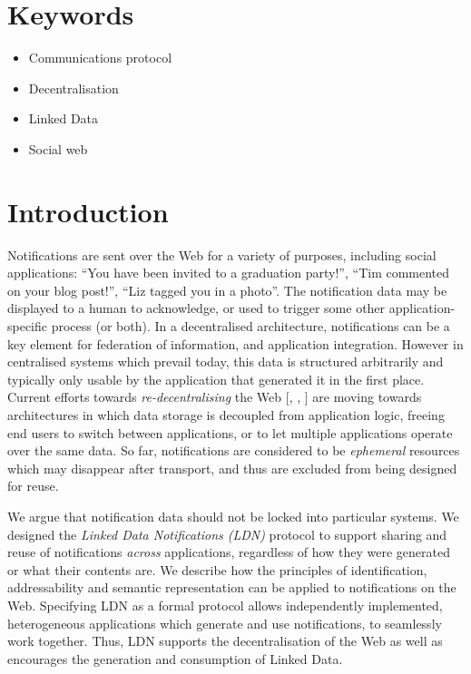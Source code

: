 \documentclass[a4paper]{llncs}
\begin{document}
                        \section{Keywords}
  \label{keywords}


                            \begin{itemize}
  \item \empty Communications protocol\item \empty Decentralisation\item \empty Linked Data\item \empty Social web
    \end{itemize}





                        \section{Introduction}
  \label{introduction}



\par Notifications are sent over the Web for a variety of purposes, including social applications: ``You have been invited to a graduation party!'', ``Tim commented on your blog post!'', ``Liz tagged you in a photo''. The notification data may be displayed to a human to acknowledge, or used to trigger some other application-specific process (or both). In a decentralised architecture, notifications can be a key element for federation of information, and application integration. However in centralised systems which prevail today, this data is structured arbitrarily and typically only usable by the application that generated it in the first place. Current efforts towards {\em re-decentralising} the Web [, , ] are moving towards architectures in which data storage is decoupled from application logic, freeing end users to switch between applications, or to let multiple applications operate over the same data. So far, notifications are considered to be {\em ephemeral} resources which may disappear after transport, and thus are excluded from being designed for reuse.


\par We argue that notification data should not be locked into particular systems. We designed the {\em Linked Data Notifications (LDN)} protocol to support sharing and reuse of notifications {\em across} applications, regardless of how they were generated or what their contents are. We describe how the principles of identification, addressability and semantic representation can be applied to notifications on the Web. Specifying LDN as a formal protocol allows independently implemented, heterogeneous applications which generate and use notifications, to seamlessly work together. Thus, LDN supports the decentralisation of the Web as well as encourages the generation and consumption of Linked Data.
\end{document}
